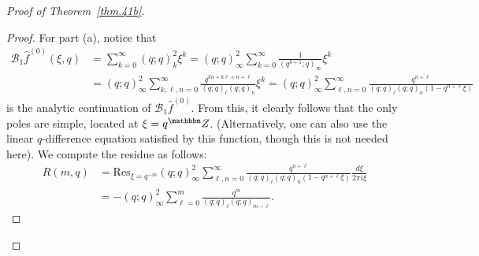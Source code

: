 \documentclass[12pt,reqno]{amsart}
\theoremstyle{definition}
\def\BZ{\mathbbm Z}
\def\Res{\mathrm{Res}}
\def\be{\begin{equation}}
\def\ee{\end{equation}}
\def\Bor{\mathcal{B}}
\begin{document}
\begin{proof}[Proof of Theorem~\ref{thm.41b}]
\begin{proof}
For part (a), notice that
\be
\begin{aligned}
\Bor_{1}\hat{f}^{(0)}(\xi,q)
&=
\sum_{k=0}^{\infty}(q;q)_{k}^{2}\xi^{k}
=
(q;q)_{\infty}^{2}\sum_{k=0}^{\infty}\frac{1}{(q^{k+1};q)_{\infty}}\xi^{k}\\
&=
(q;q)_{\infty}^{2}\sum_{k,\ell,n=0}^{\infty}
\frac{q^{kn+k\ell+n+\ell}}{(q;q)_{\ell}(q;q)_{n}}\xi^{k}
=
(q;q)_{\infty}^{2}\sum_{\ell,n=0}^{\infty}\frac{q^{n+\ell}}{
  (q;q)_{\ell}(q;q)_{n}(1-q^{n+\ell}\xi)}
\end{aligned}
\ee
is the analytic continuation of $\Bor_{1}\hat{f}^{(0)}$. From this, it clearly
follows that the only poles are simple, located at $\xi=q^\BZ$. (Alternatively,
one can also use the linear $q$-difference equation satisfied by this function,
though this is not needed here). We compute the residue as follows:
\be
\begin{aligned}
R(m,q)
&=
\Res_{\xi=q^{-m}}(q;q)_{\infty}^{2}\sum_{\ell,n=0}^{\infty}
\frac{q^{n+\ell}}{(q;q)_{\ell}(q;q)_{n}(1-q^{n+\ell}\xi)}\frac{d\xi}{2\pi i\xi}\\
&=
-(q;q)_{\infty}^{2}\sum_{\ell=0}^{m}\frac{q^{m}}{(q;q)_{\ell}(q;q)_{m-\ell}}.
\end{aligned}
\ee


\end{proof}
\end{proof}
\end{document}
